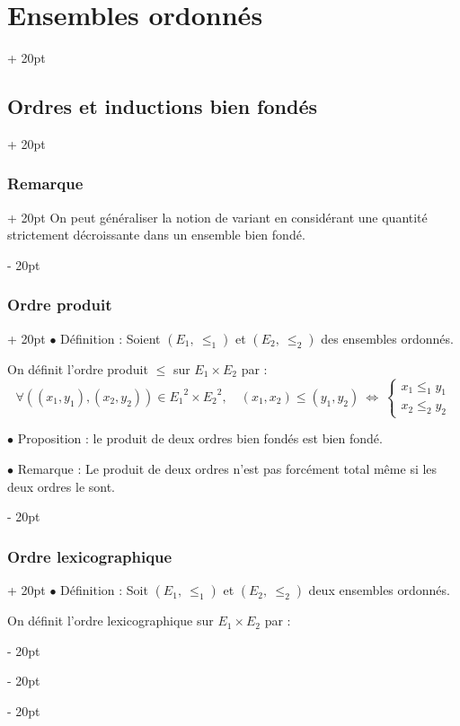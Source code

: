 \documentclass[a4paper, 12pt, twoside]{article}
\newcommand{\ssi}{\ \Leftrightarrow \ }
\newcommand{\eqsys}[2]{\begin{cases} #1 \\ #2 \end{cases}}
\renewcommand{\le}{\leqslant}
\newcommand{\ind}[1][20pt]{\advance\leftskip + #1}
\newcommand{\deind}[1][20pt]{\advance\leftskip - #1}
\newenvironment{indt}[2][20pt]{#2 \par \ind[#1]}{\par \deind} %
\begin{document}
\begin{indt}{\section{Ensembles ordonnés}}
\begin{indt}{\subsection{Ordres et inductions bien fondés}}
            \vspace{6pt}
            
            \begin{indt}{\subsubsection{Remarque}}
                On peut généraliser la notion de variant en considérant une quantité strictement décroissante dans un ensemble bien fondé.
            \end{indt}
            
            \vspace{6pt}
            
            \begin{indt}{\subsubsection{Ordre produit}}
                $\bullet$ Définition : Soient $(E_1,\ \le_1)$ et $(E_2,\ \le_2)$ des ensembles ordonnés.
                
                On définit l'ordre produit $\le$ sur $E_1 \times E_2$ par :
                    \[ \forall ((x_1, y_1), (x_2, y_2)) \in {E_1}^2 \times {E_2}^2,\quad (x_1, x_2) \le (y_1, y_2) \ssi \eqsys{x_1 \le_1 y_1}{x_2 \le_2 y_2} \]
                
                \vspace{6pt}
                
                $\bullet$ Proposition : le produit de deux ordres bien fondés est bien fondé.
                
                $\bullet$ Remarque : Le produit de deux ordres n'est pas forcément total même si les deux ordres le sont.
            \end{indt}
            
            \vspace{6pt}
            
            \begin{indt}{\subsubsection{Ordre lexicographique}}
                $\bullet$ Définition : Soit $(E_1,\ \le_1)$ et $(E_2, \ \le_2)$ deux ensembles ordonnés.
                
                On définit l'ordre lexicographique sur $E_1 \times E_2$ par :
                

\end{indt}
\end{indt}
\end{indt}
\end{document}
